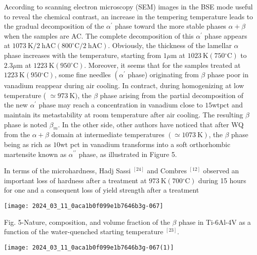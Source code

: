 \documentclass[10pt]{article}
\begin{document}
According to scanning electron microscopy (SEM) images in the BSE mode useful to reveal the chemical contrast, an increase in the tempering temperature leads to the gradual decomposition of the $\alpha^{\prime}$ phase toward the more stable phases $\alpha+\beta$ when the samples are AC. The complete decomposition of this $\alpha^{\prime}$ phase appears at $1073 \mathrm{~K} / 2 \mathrm{~h} \mathrm{AC}\left(800^{\circ} \mathrm{C} / 2 \mathrm{~h} \mathrm{AC}\right)$. Obviously, the thickness of the lamellar $\alpha$ phase increases with the temperature, starting from $1 \mu \mathrm{m}$ at $1023 \mathrm{~K}\left(750{ }^{\circ} \mathrm{C}\right)$ to $2.3 \mu \mathrm{m}$ at $1223 \mathrm{~K}\left(950{ }^{\circ} \mathrm{C}\right)$. Moreover, it seems that for the samples treated at $1223 \mathrm{~K}\left(950{ }^{\circ} \mathrm{C}\right)$, some fine needles $\left(\alpha^{\prime}\right.$ phase) originating from $\beta$ phase poor in vanadium reappear during air cooling. In contract, during homogenizing at low temperature ( $\simeq 973 \mathrm{~K})$, the $\beta$ phase arising from the partial decomposition of the new $\alpha^{\prime}$ phase may reach a concentration in vanadium close to $15 \mathrm{wt} \mathrm{pct}$ and maintain its metastability at room temperature after air cooling. The resulting $\beta$ phase is noted $\beta_{m}$. In the other side, other authors have noticed that after WQ from the $\alpha+\beta$ domain at intermediate temperatures $(\simeq 1073 \mathrm{~K})$, the $\beta$ phase being as rich as $10 \mathrm{wt}$ pct in vanadium transforms into a soft orthorhombic martensite known as $\alpha^{\prime \prime}$ phase, as illustrated in Figure 5.

In terms of the microhardness, Hadj Sassi ${ }^{[24]}$ and Combres ${ }^{[12]}$ observed an important loss of hardness after a treatment at $973 \mathrm{~K}\left(700{ }^{\circ} \mathrm{C}\right)$ during 15 hours for one and a consequent loss of yield strength after a treatment

\begin{center}
\texttt{[image: 2024\_03\_11\_0aca1b0f099e1b7646b3g-067]}
\end{center}

Fig. 5-Nature, composition, and volume fraction of the $\beta$ phase in Ti-6Al-4V as a function of the water-quenched starting temperature ${ }^{[23]}$.

\begin{center}
\texttt{[image: 2024\_03\_11\_0aca1b0f099e1b7646b3g-067(1)]}
\end{center}
\end{document}

